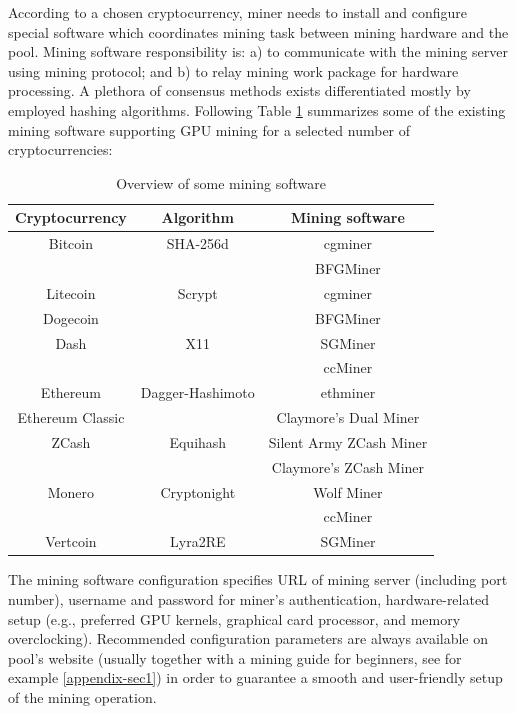 \documentclass[preprint,12pt,3p]{elsarticle}
\begin{document}
According to a chosen cryptocurrency, miner needs to install and configure special software which coordinates mining task between mining hardware and the pool. Mining software responsibility is: a) to communicate with the mining server using mining protocol; and b) to relay mining work package for hardware processing. A plethora of consensus methods exists differentiated mostly by employed hashing algorithms. Following Table \ref{tab:software} summarizes some of the existing mining software supporting GPU mining for a selected number of cryptocurrencies:

\begin{table}
\centering
\begin{tabular}{|c|c|c|}
    \hline
    \textbf{Cryptocurrency} & \textbf{Algorithm} & \textbf{Mining software} \\
    \hline\hline
    Bitcoin & SHA-256d & cgminer \\
     &  & BFGMiner \\
    \hline
    Litecoin & Scrypt & cgminer \\
    Dogecoin &  & BFGMiner \\
    \hline
    Dash & X11 & SGMiner \\
     &  & ccMiner \\
    \hline
    Ethereum & Dagger-Hashimoto & ethminer \\
    Ethereum Classic &  & Claymore's Dual Miner \\
    \hline
    ZCash & Equihash & Silent Army ZCash Miner \\
     &  & Claymore's ZCash Miner \\
    \hline
    Monero & Cryptonight & Wolf Miner \\
     &  & ccMiner \\
    \hline
    Vertcoin & Lyra2RE & SGMiner \\
    \hline
\end{tabular}
\caption{Overview of some mining software}
\label{tab:software} 
\end{table}

The mining software configuration specifies URL of mining server (including port number), username and password for miner's authentication, hardware-related setup (e.g., preferred GPU kernels, graphical card processor, and memory overclocking). Recommended configuration parameters are always available on pool's website (usually together with a mining guide for beginners, see for example \ref{appendix-sec1}) in order to guarantee a smooth and user-friendly setup of the mining operation.
\end{document}
